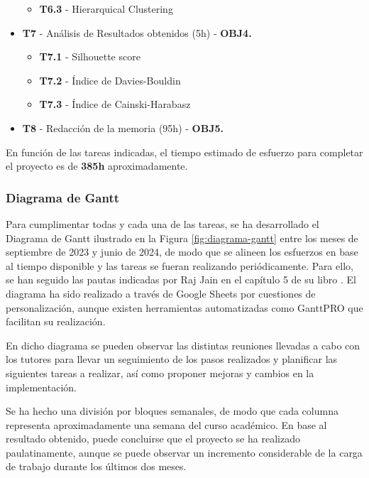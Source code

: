 \begin{itemize}
\begin{itemize}
        \item \textbf{T6.3} - Hierarquical Clustering
    \end{itemize}
    \item \textbf{T7} - Análisis de Resultados obtenidos (5h)  - \textbf{OBJ4.}
    \begin{itemize}
        \item \textbf{T7.1} - Silhouette score
        \item \textbf{T7.2} - Índice de Davies-Bouldin
        \item \textbf{T7.3} - Índice de Cainski-Harabasz
    \end{itemize}
    \item \textbf{T8} - Redacción de la memoria (95h)  - \textbf{OBJ5.}
\end{itemize}

En función de las tareas indicadas, el tiempo estimado de esfuerzo para completar el proyecto es de \textbf{385h} aproximadamente. \\

\vspace{-4mm}

\subsubsection*{Diagrama de Gantt}

Para cumplimentar todas y cada una de las tareas, se ha desarrollado el Diagrama de Gantt ilustrado en la Figura \ref{fig:diagrama-gantt} entre los meses de septiembre de 2023 y junio de 2024, de modo que se alineen los esfuerzos en base al tiempo disponible y las tareas se fueran realizando periódicamente. Para ello, se han seguido las pautas indicadas por Raj Jain en el capítulo 5 de su libro \cite{jain1991art}. El diagrama ha sido realizado a través de Google Sheets por cuestiones de personalización, aunque existen herramientas automatizadas como GanttPRO \cite{GanttPRO} que facilitan su realización.

En dicho diagrama se pueden observar las distintas reuniones llevadas a cabo con los tutores para llevar un seguimiento de los pasos realizados y planificar las siguientes tareas a realizar, así como proponer mejoras y cambios en la implementación. 

Se ha hecho una división por bloques semanales, de modo que cada columna representa aproximadamente una semana del curso académico. En base al resultado obtenido, puede concluirse que el proyecto se ha realizado paulatinamente, aunque se puede observar un incremento considerable de la carga de trabajo durante los últimos dos meses.

